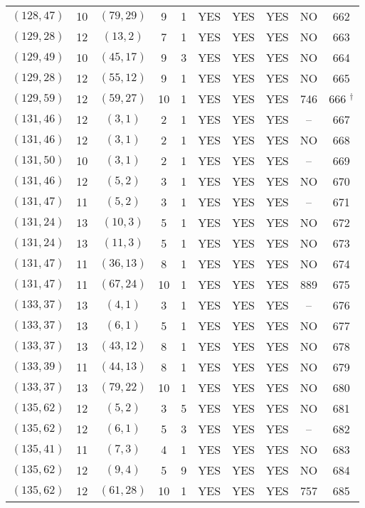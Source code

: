 \begin{longtable}{|c|c|c|c|c|c|c|c|c|c|}
$(128, 47)$ & 10 & $(79, 29)$ & 9 & 1 & YES & YES & YES & NO & 662\\
$(129, 28)$ & 12 & $(13, 2)$ & 7 & 1 & YES & YES & YES & NO & 663\\
$(129, 49)$ & 10 & $(45, 17)$ & 9 & 3 & YES & YES & YES & NO & 664\\
$(129, 28)$ & 12 & $(55, 12)$ & 9 & 1 & YES & YES & YES & NO & 665\\
$(129, 59)$ & 12 & $(59, 27)$ & 10 & 1 & YES & YES & YES & 746 & 666 ${}^\dagger$\\
$(131, 46)$ & 12 & $(3, 1)$ & 2 & 1 & YES & YES & YES & -- & 667\\
$(131, 46)$ & 12 & $(3, 1)$ & 2 & 1 & YES & YES & YES & NO & 668\\
$(131, 50)$ & 10 & $(3, 1)$ & 2 & 1 & YES & YES & YES & -- & 669\\
$(131, 46)$ & 12 & $(5, 2)$ & 3 & 1 & YES & YES & YES & NO & 670\\
$(131, 47)$ & 11 & $(5, 2)$ & 3 & 1 & YES & YES & YES & -- & 671\\
$(131, 24)$ & 13 & $(10, 3)$ & 5 & 1 & YES & YES & YES & NO & 672\\
$(131, 24)$ & 13 & $(11, 3)$ & 5 & 1 & YES & YES & YES & NO & 673\\
$(131, 47)$ & 11 & $(36, 13)$ & 8 & 1 & YES & YES & YES & NO & 674\\
$(131, 47)$ & 11 & $(67, 24)$ & 10 & 1 & YES & YES & YES & 889 & 675\\
$(133, 37)$ & 13 & $(4, 1)$ & 3 & 1 & YES & YES & YES & -- & 676\\
$(133, 37)$ & 13 & $(6, 1)$ & 5 & 1 & YES & YES & YES & NO & 677\\
$(133, 37)$ & 13 & $(43, 12)$ & 8 & 1 & YES & YES & YES & NO & 678\\
$(133, 39)$ & 11 & $(44, 13)$ & 8 & 1 & YES & YES & YES & NO & 679\\
$(133, 37)$ & 13 & $(79, 22)$ & 10 & 1 & YES & YES & YES & NO & 680\\
$(135, 62)$ & 12 & $(5, 2)$ & 3 & 5 & YES & YES & YES & NO & 681\\
$(135, 62)$ & 12 & $(6, 1)$ & 5 & 3 & YES & YES & YES & -- & 682\\
$(135, 41)$ & 11 & $(7, 3)$ & 4 & 1 & YES & YES & YES & NO & 683\\
$(135, 62)$ & 12 & $(9, 4)$ & 5 & 9 & YES & YES & YES & NO & 684\\
$(135, 62)$ & 12 & $(61, 28)$ & 10 & 1 & YES & YES & YES & 757 & 685\\

\end{longtable}
